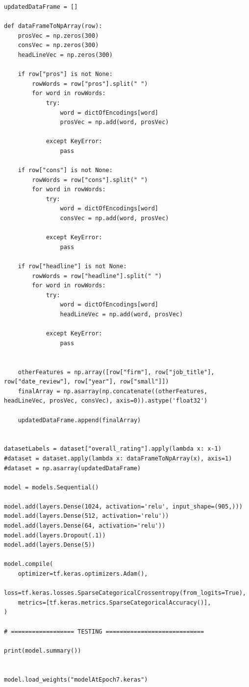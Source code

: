 \documentclass{article}
\begin{document}
\begin{lstlisting}
updatedDataFrame = []

def dataFrameToNpArray(row):
    prosVec = np.zeros(300)
    consVec = np.zeros(300)
    headLineVec = np.zeros(300)

    if row["pros"] is not None:
        rowWords = row["pros"].split(" ")
        for word in rowWords:
            try:
                word = dictOfEncodings[word]
                prosVec = np.add(word, prosVec)

            except KeyError:
                pass

    if row["cons"] is not None:
        rowWords = row["cons"].split(" ")
        for word in rowWords:
            try:
                word = dictOfEncodings[word]
                consVec = np.add(word, prosVec)

            except KeyError:
                pass

    if row["headline"] is not None:
        rowWords = row["headline"].split(" ")
        for word in rowWords:
            try:
                word = dictOfEncodings[word]
                headLineVec = np.add(word, prosVec)

            except KeyError:
                pass


    otherFeatures = np.array([row["firm"], row["job_title"], row["date_review"], row["year"], row["small"]])
    finalArray = np.asarray(np.concatenate((otherFeatures, headLineVec, prosVec, consVec), axis=0)).astype('float32')

    updatedDataFrame.append(finalArray)


datasetLabels = dataset["overall_rating"].apply(lambda x: x-1)
#dataset = dataset.apply(lambda x: dataFrameToNpArray(x), axis=1)
#dataset = np.asarray(updatedDataFrame)

model = models.Sequential()

model.add(layers.Dense(1024, activation='relu', input_shape=(905,)))
model.add(layers.Dense(512, activation='relu'))
model.add(layers.Dense(64, activation='relu'))
model.add(layers.Dropout(.1))
model.add(layers.Dense(5))

model.compile(
    optimizer=tf.keras.optimizers.Adam(),
    loss=tf.keras.losses.SparseCategoricalCrossentropy(from_logits=True),
    metrics=[tf.keras.metrics.SparseCategoricalAccuracy()],
)

# ================== TESTING ============================

print(model.summary())


model.load_weights("modelAtEpoch7.keras")


\end{lstlisting}
\end{document}
